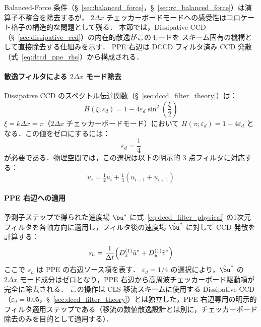 Balanced-Force 条件（§~\ref{sec:balanced_force}，§~\ref{sec:rc_balanced_force}）は演算子不整合を除去するが，
$2\Delta x$ チェッカーボードモードへの感受性はコロケート格子の構造的な問題として残る．
本節では，Dissipative CCD（§~\ref{sec:dissipative_ccd}）の内在的散逸がこのモードを
スキーム固有の機構として直接除去する仕組みを示す．
PPE 右辺は DCCD フィルタ済み CCD 発散（式~\eqref{eq:dccd_ppe_rhs}）から構成される．

\paragraph{散逸フィルタによる $2\Delta x$ モード除去}

Dissipative CCD のスペクトル伝達関数（§~\ref{sec:dccd_filter_theory}）は：
\begin{equation}
  H(\xi;\varepsilon_d) = 1 - 4\varepsilon_d\sin^2\!\left(\frac{\xi}{2}\right)
  \label{eq:dccd_transfer_decoupling}
\end{equation}
$\xi = k\Delta x = \pi$（$2\Delta x$ チェッカーボードモード）において $H(\pi;\varepsilon_d) = 1 - 4\varepsilon_d$ となる．この値をゼロにするには：
\begin{equation}
  \varepsilon_d = \frac{1}{4}
  \label{eq:dccd_eps_checkerboard}
\end{equation}
が必要である．物理空間では，この選択は以下の明示的 3 点フィルタに対応する：
\begin{equation}
  \tilde{u}_i = \tfrac{1}{2}u_i + \tfrac{1}{4}(u_{i-1} + u_{i+1})
  \label{eq:dccd_filter_physical}
\end{equation}

\paragraph{PPE 右辺への適用}

予測子ステップで得られた速度場 $\bu^*$ に式~\eqref{eq:dccd_filter_physical} の1次元フィルタを各軸方向に適用し，フィルタ後の速度場 $\tilde{\bu}^*$ に対して CCD 発散を計算する：
\begin{equation}
  s_h = \frac{1}{\Delta t}\Bigl(D_x^{(1)}\tilde{u}^* + D_y^{(1)}\tilde{v}^*\Bigr)
  \label{eq:dccd_ppe_rhs}
\end{equation}
ここで $s_h$ は PPE の右辺ソース項を表す．
$\varepsilon_d = 1/4$ の選択により，$\tilde{\bu}^*$ の $2\Delta x$ モード成分はゼロとなり，PPE 右辺から高周波チェッカーボード駆動項が完全に除去される．
この操作は CLS 移流スキームに使用する Dissipative CCD（$\varepsilon_d = 0.05$，§~\ref{sec:dccd_filter_theory}）とは独立した，PPE 右辺専用の明示的フィルタ適用ステップである（移流の数値散逸設計とは別に，チェッカーボード除去のみを目的として適用する）．

